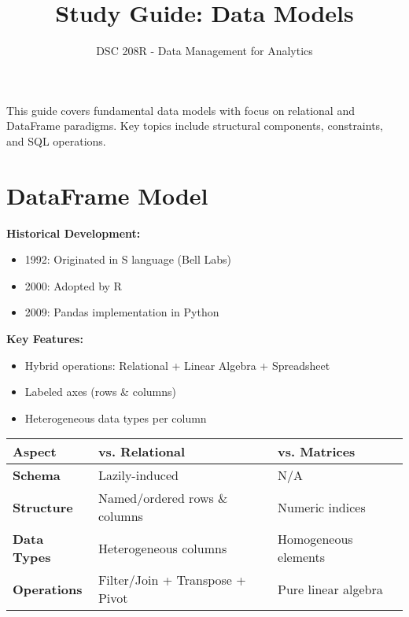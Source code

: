 \documentclass[12pt]{article}
\title{Study Guide: Data Models}
\author{DSC 208R - Data Management for Analytics}
\date{}
\begin{document}
\maketitle

\begin{tcolorbox}[colback=blue!5!white,colframe=blue!75!black,title=Module Overview]
This guide covers fundamental data models with focus on relational and DataFrame paradigms. Key topics include structural components, constraints, and SQL operations.
\end{tcolorbox}

\section{DataFrame Model}
\begin{tcolorbox}[colback=yellow!5!white,colframe=yellow!75!black,title=Core Concepts]
\textbf{Historical Development:}
\begin{itemize}
    \item 1992: Originated in S language (Bell Labs)
    \item 2000: Adopted by R
    \item 2009: Pandas implementation in Python
\end{itemize}

\textbf{Key Features:}
\begin{itemize}
    \item Hybrid operations: Relational + Linear Algebra + Spreadsheet
    \item Labeled axes (rows \& columns)
    \item Heterogeneous data types per column
\end{itemize}
\end{tcolorbox}

\begin{tcolorbox}[colback=green!5!white,colframe=green!75!black,title=Comparative Analysis]
\renewcommand{\arraystretch}{1.5}
\begin{tabular}{>{\bfseries}l p{5cm} p{5cm}}
  \textbf{Aspect} & \textbf{vs. Relational} & \textbf{vs. Matrices} \\ \hline
  Schema & Lazily-induced & N/A \\
  Structure & Named/ordered rows \& columns & Numeric indices \\
  Data Types & Heterogeneous columns & Homogeneous elements \\
  Operations & Filter/Join + Transpose + Pivot & Pure linear algebra \\
\end{tabular}
\end{tcolorbox}
\end{document}
